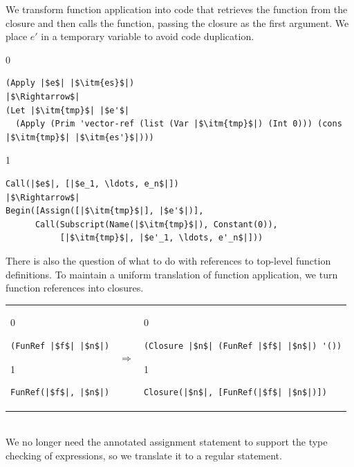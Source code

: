 \documentclass[7x10,nocrop]{TimesAPriori_MIT}%
\def\racketEd{0}
\def\pythonEd{1}
\def\edition{0}
\begin{document}
We transform function application into code that retrieves the
function from the closure and then calls the function, passing the
closure as the first argument. We place $e'$ in a temporary variable
to avoid code duplication.
\begin{center}
\begin{minipage}{\textwidth}
{\if\edition\racketEd
\begin{lstlisting}
(Apply |$e$| |$\itm{es}$|)
|$\Rightarrow$|
(Let |$\itm{tmp}$| |$e'$|
  (Apply (Prim 'vector-ref (list (Var |$\itm{tmp}$|) (Int 0))) (cons |$\itm{tmp}$| |$\itm{es'}$|)))
\end{lstlisting}
\fi}
%
{\if\edition\pythonEd
\begin{lstlisting}
Call(|$e$|, [|$e_1, \ldots, e_n$|])
|$\Rightarrow$|
Begin([Assign([|$\itm{tmp}$|], |$e'$|)],
      Call(Subscript(Name(|$\itm{tmp}$|), Constant(0)),
           [|$\itm{tmp}$|, |$e'_1, \ldots, e'_n$|]))
\end{lstlisting}
\fi}
\end{minipage}
\end{center}

There is also the question of what to do with references to top-level
function definitions. To maintain a uniform translation of function
application, we turn function references into closures.

\begin{tabular}{lll}
\begin{minipage}{0.3\textwidth}
{\if\edition\racketEd
\begin{lstlisting}
(FunRef |$f$| |$n$|)
\end{lstlisting}
\fi}
{\if\edition\pythonEd
\begin{lstlisting}
FunRef(|$f$|, |$n$|)
\end{lstlisting}
\fi}
\end{minipage}
&
$\Rightarrow$
&
\begin{minipage}{0.5\textwidth}
{\if\edition\racketEd
\begin{lstlisting}
(Closure |$n$| (FunRef |$f$| |$n$|) '())
\end{lstlisting}
\fi}
{\if\edition\pythonEd
\begin{lstlisting}
Closure(|$n$|, [FunRef(|$f$| |$n$|)])
\end{lstlisting}
\fi}
\end{minipage}
\end{tabular}  \\


We no longer need the annotated assignment statement 
to support the type checking of  expressions, so we
translate it to a regular  statement.
\end{document}
